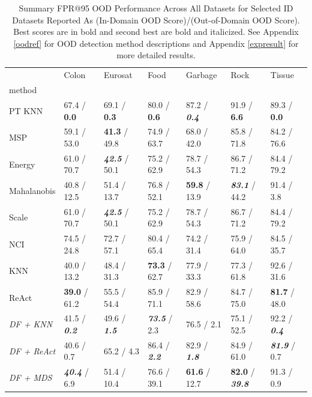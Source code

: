 \documentclass[letterpaper]{article} %
\theoremstyle{plain}
\theoremstyle{definition}
\theoremstyle{remark}
\begin{document}
\begin{table}
\centering
\caption{Summary FPR@95 OOD Performance Across All Datasets for Selected ID Datasets Reported As (In-Domain OOD Score)/(Out-of-Domain OOD Score). Best scores are in bold and second best are bold and italicized. See Appendix \ref{oodref} for OOD detection method descriptions and Appendix \ref{expresult} for more detailed results.}
\label{tab:fpr95}
\begin{tabular}{lllllll}
\toprule
& Colon & Eurosat & Food & Garbage & Rock & Tissue \\
method &  &  &  &  &  &  \\
\midrule
PT KNN & 67.4 / \textbf{0.0} & 69.1 / \textbf{0.3} & 80.0 / \textbf{0.6} & 87.2 / \textbf{\textit{0.4}} & 91.9 / \textbf{6.6} & 89.3 / \textbf{0.0} \\
MSP & 59.1 / 53.0 & \textbf{41.3} / 49.8 & 74.9 / 63.7 & 68.0 / 42.0 & 85.8 / 71.8 & 84.2 / 76.6 \\
Energy & 61.0 / 70.7 & \textbf{\textit{42.5}} / 50.1 & 75.2 / 62.9 & 78.7 / 54.3 & 86.7 / 71.2 & 84.4 / 79.2 \\
Mahalanobis & 40.8 / 12.5 & 51.4 / 13.7 & 76.8 / 52.1 & \textbf{59.8} / 13.9 & \textbf{\textit{83.1}} / 44.2 & 91.4 / 3.8 \\
Scale & 61.0 / 70.7 & \textbf{\textit{42.5}} / 50.1 & 75.2 / 62.9 & 78.7 / 54.3 & 86.7 / 71.2 & 84.4 / 79.2 \\
NCI & 74.5 / 24.8 & 72.7 / 57.1 & 80.4 / 65.4 & 74.2 / 31.4 & 75.9 / 64.0 & 84.5 / 35.7 \\
KNN & 40.0 / 13.2 & 48.4 / 31.3 & \textbf{73.3} / 62.7 & 77.9 / 33.3 & 77.3 / 61.8 & 92.6 / 31.6 \\
ReAct & \textbf{39.0} / 61.2 & 55.5 / 54.4 & 85.9 / 71.1 & 82.9 / 58.6 & 84.7 / 75.0 & \textbf{81.7} / 48.0 \\
\textit{DF + KNN} & 41.5 / \textbf{\textit{0.2}} & 49.6 / \textbf{\textit{1.5}} & \textbf{\textit{73.5}} / 2.3 & 76.5 / 2.1 & 75.1 / 52.5 & 92.2 / \textbf{\textit{0.4}} \\
\textit{DF + ReAct} & 40.6 / 0.7 & 65.2 / 4.3 & 86.4 / \textbf{\textit{2.2}} & 82.9 / \textbf{\textit{1.8}} & 84.9 / 61.0 & \textbf{\textit{81.9}} / 0.7 \\
\textit{DF + MDS} & \textbf{\textit{40.4}} / 6.9 & 51.4 / 10.4 & 76.6 / 39.1 & \textbf{61.6} / 12.7 & \textbf{82.0} / \textbf{\textit{39.8}} & 91.3 / 0.9 \\
\bottomrule
\end{tabular}
\end{table}
\end{document}
